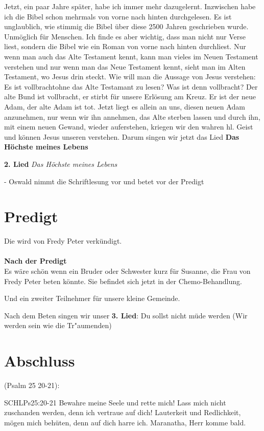 \documentclass{../inc/mybib}
\begin{document}
Jetzt, ein paar Jahre später, habe ich immer mehr dazugelernt. Inzwischen habe ich die Bibel schon mehrmals von vorne nach hinten durchgelesen. Es ist unglaublich, wie stimmig die Bibel über diese 2500 Jahren geschrieben wurde. Unmöglich für Menschen. Ich finde es aber wichtig, dass man nicht nur Verse liest, sondern die Bibel wie ein Roman von vorne nach hinten durchliest. Nur wenn man auch das Alte Testament kennt, kann man vieles im Neuen Testament verstehen und nur wenn man das Neue Testament kennt, sieht man im Alten Testament, wo Jesus drin steckt. Wie will man die Aussage von Jesus verstehen: \glqq{}Es ist vollbracht\grqq ohne das Alte Testamant zu lesen? Was ist denn vollbracht? Der alte Bund ist vollbracht, er stirbt für unsere Erlösung am Kreuz. Er ist der neue Adam, der alte Adam ist tot. Jetzt liegt es allein an uns, diesen neuen Adam anzunehmen, nur wenn wir ihn annehmen, das Alte sterben lassen und durch ihn, mit einem neuen Gewand, wieder auferstehen, kriegen wir den wahren hl. Geist und können Jesus unseren \herr{} verstehen.
Darum singen wir jetzt das Lied \textbf{Das Höchste meines Lebens}

\textbf{2. Lied} \textit{Das Höchste meines Lebens}

- Oswald nimmt die Schriftlesung vor und betet vor der Predigt

\section{Predigt}
Die wird von Fredy Peter verkündigt.
\\
\\
\textbf{Nach der Predigt}\\
Es wäre schön wenn ein Bruder oder Schwester kurz für Susanne, die Frau von Fredy Peter beten könnte. 
Sie befindet sich jetzt in der Chemo-Behandlung.

Und ein zweiter Teilnehmer für unsere kleine Gemeinde.

Nach dem Beten singen wir unser \textbf{3. Lied}: Du sollst nicht m\"ude werden (Wir werden sein wie die Tr\̈"aumenden)

\section{Abschluss}
(Psalm 25 20-21):
\begin{bibelbox}{SCHL}{Ps}{25:20-21}
Bewahre meine Seele und rette mich! Lass mich nicht zuschanden werden, denn ich vertraue auf dich! Lauterkeit und Redlichkeit, mögen mich behüten, denn auf dich harre ich.
Maranatha, Herr komme bald.
\end{bibelbox}
\end{document}
